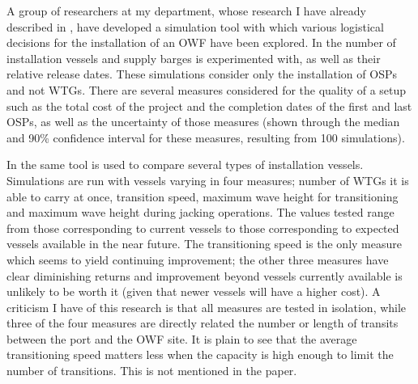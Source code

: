 \documentclass[a4paper,12pt]{article}
\begin{document}
\bigskip

A group of researchers at my department, whose research \cite{barlow2018mixed} I have already described in , have developed a simulation tool with which various logistical decisions for the installation of an OWF have been explored. In \cite{barlow2014support} the number of installation vessels and supply barges is experimented with, as well as their relative release dates. These simulations consider only the installation of OSPs and not WTGs. There are several measures considered for the quality of a setup such as the total cost of the project and the completion dates of the first and last OSPs, as well as the uncertainty of those measures (shown through the median and 90\% confidence interval for these measures, resulting from 100 simulations). 

In \cite{barlow2014assessment} the same tool is used to compare several types of installation vessels. Simulations are run with vessels varying in four measures; number of WTGs it is able to carry at once, transition speed, maximum wave height for transitioning and maximum wave height during jacking operations. The values tested range from those corresponding to current vessels to those corresponding to expected vessels available in the near future. The transitioning speed is the only measure which seems to yield continuing improvement; the other three measures have clear diminishing returns and improvement beyond vessels currently available is unlikely to be worth it (given that newer vessels will have a higher cost). A criticism I have of this research is that all measures are tested in isolation, while three of the four measures are directly related the number or length of transits between the port and the OWF site. It is plain to see that the average transitioning speed matters less when the capacity is high enough to limit the number of transitions. This is not mentioned in the paper.
\end{document}
